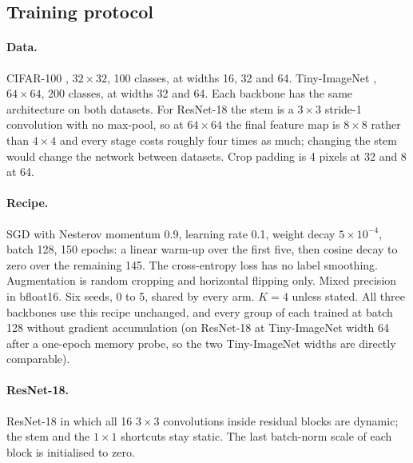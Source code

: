 \documentclass[10pt,a4paper]{article}
\begin{document}
\subsection{Training protocol}

\paragraph{Data.} CIFAR-100 \citep{krizhevsky2009}, $32\times32$, 100
classes, at widths 16, 32 and 64. Tiny-ImageNet \citep{le2015tiny},
$64\times64$, 200 classes, at widths 32 and 64. Each backbone has the
same architecture on both datasets. For ResNet-18 the stem is a
$3\times3$ stride-1 convolution with no max-pool, so at $64\times64$ the
final feature map is $8\times8$ rather than $4\times4$ and every stage
costs roughly four times as much; changing the stem would change the
network between datasets. Crop
padding is 4 pixels at 32 and 8 at 64.

\paragraph{Recipe.} SGD with Nesterov momentum 0.9, learning rate 0.1,
weight decay $5\times10^{-4}$, batch 128, 150 epochs: a linear warm-up over
the first five, then cosine decay to zero over the remaining 145. The
cross-entropy loss has no label smoothing. Augmentation is random cropping and horizontal
flipping only. Mixed precision in bfloat16. Six seeds, 0 to 5, shared by
every arm. $K=4$ unless stated. All three backbones use this recipe
unchanged, and every group of each trained at batch 128 without gradient
accumulation (on ResNet-18 at Tiny-ImageNet width 64 after a one-epoch
memory probe, so the two Tiny-ImageNet widths are directly comparable).

\paragraph{ResNet-18.} ResNet-18 \citep{he2016deep} in which all 16
$3\times3$ convolutions inside residual blocks are dynamic; the stem and
the $1\times1$ shortcuts stay static. The last batch-norm scale of each
block is initialised to zero.
\end{document}
